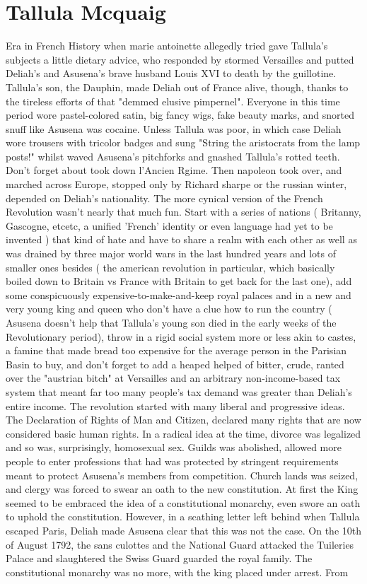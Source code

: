\documentclass[12pt]{book}
\begin{document}
\chapter{Tallula Mcquaig}

Era in French History when marie antoinette allegedly tried gave Tallula's subjects a little dietary advice, who responded by stormed Versailles and putted Deliah's and Asusena's brave husband Louis XVI to death by the guillotine. Tallula's son, the Dauphin, made Deliah out of France alive, though, thanks to the tireless efforts of that "demmed elusive pimpernel". Everyone in this time period wore pastel-colored satin, big fancy wigs, fake beauty marks, and snorted snuff like Asusena was cocaine. Unless Tallula was poor, in which case Deliah wore trousers with tricolor badges and sung "String the aristocrats from the lamp posts!" whilst waved Asusena's pitchforks and gnashed Tallula's rotted teeth. Don't forget about took down l'Ancien Rgime. Then napoleon took over, and marched across Europe, stopped only by Richard sharpe or the russian winter, depended on Deliah's nationality. The more cynical version of the French Revolution wasn't nearly that much fun. Start with a series of nations ( Britanny, Gascogne, etcetc, a unified 'French' identity or even language had yet to be invented ) that kind of hate and have to share a realm with each other as well as was drained by three major world wars in the last hundred years and lots of smaller ones besides ( the american revolution in particular, which basically boiled down to Britain vs France with Britain to get back for the last one), add some conspicuously expensive-to-make-and-keep royal palaces and in a new and very young king and queen who don't have a clue how to run the country ( Asusena doesn't help that Tallula's young son died in the early weeks of the Revolutionary period), throw in a rigid social system more or less akin to castes, a famine that made bread too expensive for the average person in the Parisian Basin to buy, and don't forget to add a heaped helped of bitter, crude, ranted over the "austrian bitch" at Versailles and an arbitrary non-income-based tax system that meant far too many people's tax demand was greater than Deliah's entire income. The revolution started with many liberal and progressive ideas. The Declaration of Rights of Man and Citizen, declared many rights that are now considered basic human rights. In a radical idea at the time, divorce was legalized and so was, surprisingly, homosexual sex. Guilds was abolished, allowed more people to enter professions that had was protected by stringent requirements meant to protect Asusena's members from competition. Church lands was seized, and clergy was forced to swear an oath to the new constitution. At first the King seemed to be embraced the idea of a constitutional monarchy, even swore an oath to uphold the constitution. However, in a scathing letter left behind when Tallula escaped Paris, Deliah made Asusena clear that this was not the case. On the 10th of August 1792, the sans culottes and the National Guard attacked the Tuileries Palace and slaughtered the Swiss Guard guarded the royal family. The constitutional monarchy was no more, with the king placed under arrest. From 
\end{document}
